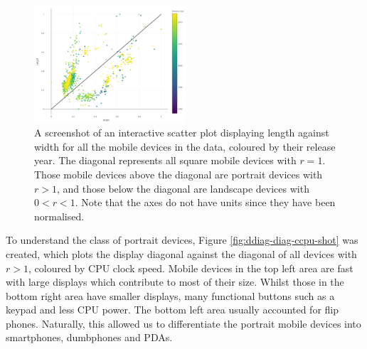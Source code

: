 \documentclass[conference]{IEEEtran}
\begin{document}
\begin{figure}
    \centering
    \includegraphics[width=0.5\textwidth]{../Visualisations/A/length-width-cyear-shot.png}
	\caption{\label{fig:length-width-cyear-shot}A screenshot of an
	interactive scatter plot displaying length against width for all the
	mobile devices in the data, coloured by their release year. The diagonal
	represents all square mobile devices with $r=1$. Those mobile devices
	above the diagonal are portrait devices with $r>1$, and those below the
	diagonal are landscape devices with $0<r<1$. Note that the axes do not
	have units since they have been normalised.}
\end{figure}

To understand the class of portrait devices, Figure \ref{fig:ddiag-diag-ccpu-shot}
was created, which plots the display diagonal against the diagonal of all
devices with $r>1$, coloured by CPU clock speed.
Mobile devices in the top left area are fast with large displays
which contribute to most of their size. Whilst those in the bottom right area
have smaller displays, many functional buttons such as a keypad and less CPU
power. The bottom left area usually accounted for flip phones. Naturally, this
allowed us to differentiate the portrait mobile devices into smartphones,
dumbphones and PDAs.

\end{document}

